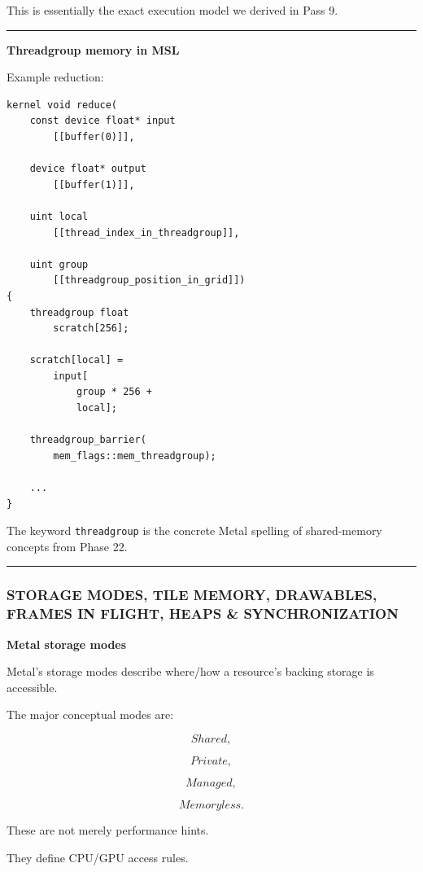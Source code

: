 This is essentially the exact execution model we derived in Pass 9.

\begin{center}\rule{0.5\linewidth}{0.5pt}\end{center}

\textbf{Threadgroup memory in MSL}

Example reduction:

\begin{verbatim}
kernel void reduce(
    const device float* input
        [[buffer(0)]],

    device float* output
        [[buffer(1)]],

    uint local
        [[thread_index_in_threadgroup]],

    uint group
        [[threadgroup_position_in_grid]])
{
    threadgroup float
        scratch[256];

    scratch[local] =
        input[
            group * 256 +
            local];

    threadgroup_barrier(
        mem_flags::mem_threadgroup);

    ...
}
\end{verbatim}

The keyword \texttt{threadgroup} is the concrete Metal spelling of shared-memory concepts from Phase 22.

\begin{center}\rule{0.5\linewidth}{0.5pt}\end{center}

\subsubsection{STORAGE MODES, TILE MEMORY, DRAWABLES, FRAMES IN FLIGHT, HEAPS \& SYNCHRONIZATION}\label{storage-modes-tile-memory-drawables-frames-in-flight-heaps-synchronization}

\textbf{Metal storage modes}

Metal's storage modes describe where/how a resource's backing storage is accessible.

The major conceptual modes are:

\[
Shared,
\]

\[
Private,
\]

\[
Managed,
\]

\[
Memoryless.
\]

These are not merely performance hints.

They define CPU/GPU access rules.

